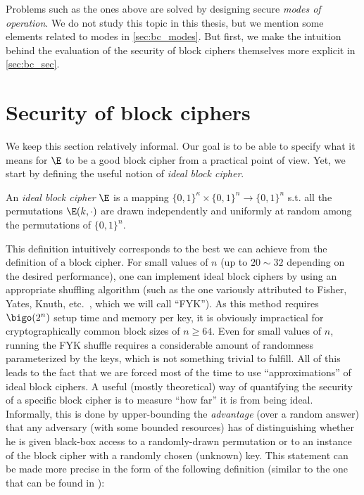 Problems such as the ones above are solved by designing secure \emph{modes of operation}. We do not study this topic in this thesis, but
we mention some elements related to modes in \autoref{sec:bc_modes}. But first, we make the intuition behind the evaluation of the security
of block ciphers themselves more explicit in \autoref{sec:bc_sec}.

\section{Security of block ciphers}
\label{sec:bc_sec}

We keep this section relatively informal. Our goal is to be able to specify what it means for $\E$ to be a good block cipher from
a practical point of view. Yet, we start by defining the useful notion of \emph{ideal block cipher}.

\begin{defi}
An \emph{ideal block cipher} $\E$ is a mapping $\{0,1\}^\kappa \times \{0,1\}^n \rightarrow \{0,1\}^n$ s.t. all the permutations
$\E(k,\cdot)$ are drawn independently and uniformly at random among the permutations of $\{0,1\}^n$.
\end{defi}

This definition intuitively corresponds to the best we can achieve from the definition of a block cipher. For small values of $n$
(\eg up to $20 \sim 32$ depending on the desired performance), one can implement ideal block ciphers by using an appropriate
shuffling algorithm (such as the one variously attributed to Fisher, Yates, Knuth, etc.~\cite{uniform_shuffle}, which we will
call ``FYK''). As this method
requires $\bigo(2^n)$ setup time and memory per key, it is obviously impractical for cryptographically common block sizes of $n \geq 64$.
Even for small values of $n$, running the FYK shuffle requires a considerable amount of randomness parameterized by the keys, which
is not something trivial to fulfill. All of this leads to the fact that we are forced most of the time to use ``approximations'' of
ideal block ciphers. A useful (mostly theoretical) way of quantifying the security of a specific block cipher is to measure ``how far'' it
is from being ideal. Informally, this is done by upper-bounding the \emph{advantage} (over a random answer) that any adversary
(with some bounded resources)
has of distinguishing whether he is given black-box access to a randomly-drawn permutation or to an instance of the block cipher
with a randomly chosen (unknown) key. This statement can be made more precise in the form of the following definition
(similar to the one that can be found \eg in \cite{DBLP:journals/jcss/BellareKR00}):

